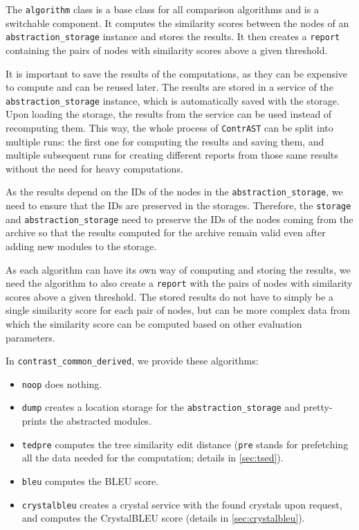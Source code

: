 The \texttt{algorithm} class is a base class for all comparison algorithms and is a switchable component.
It computes the similarity scores between the nodes of an \texttt{abstraction\_storage} instance and stores the results.
It then creates a \texttt{report} containing the pairs of nodes with similarity scores above a given threshold.

It is important to save the results of the computations, as they can be expensive to compute and can be reused later.
The results are stored in a service of the \texttt{abstraction\_storage} instance, which is automatically saved with the storage.
Upon loading the storage, the results from the service can be used instead of recomputing them.
This way, the whole process of \texttt{ContrAST} can be split into multiple runs: the first one for computing the results and saving them, and multiple subsequent runs for creating different reports from those same results without the need for heavy computations.

As the results depend on the IDs of the nodes in the \texttt{abstraction\_storage}, we need to ensure that the IDs are preserved in the storages.
Therefore, the \texttt{storage} and \texttt{abstraction\_storage} need to preserve the IDs of the nodes coming from the archive so that the results computed for the archive remain valid even after adding new modules to the storage.

As each algorithm can have its own way of computing and storing the results, we need the algorithm to also create a \texttt{report} with the pairs of nodes with similarity scores above a given threshold.
The stored results do not have to simply be a single similarity score for each pair of nodes, but can be more complex data from which the similarity score can be computed based on other evaluation parameters.

In \texttt{contrast\_common\_derived}, we provide these algorithms:
\begin{itemize}
\item \texttt{noop} does nothing.
\item \texttt{dump} creates a location storage for the \texttt{abstraction\_storage} and pretty-prints the abstracted modules.
\item \texttt{tedpre} computes the tree similarity edit distance (\texttt{pre} stands for prefetching all the data needed for the computation; details in \autoref{sec:tsed}).
\item \texttt{bleu} computes the BLEU score.
\item \texttt{crystalbleu} creates a crystal service with the found crystals upon request, and computes the CrystalBLEU score (details in \autoref{sec:crystalbleu}).
\end{itemize}

